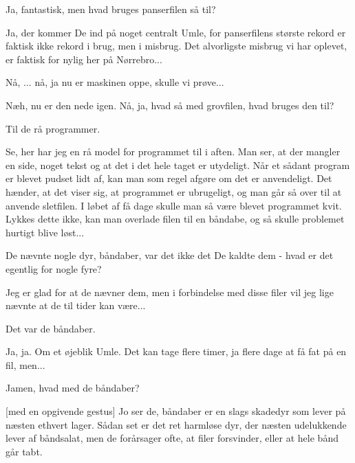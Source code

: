\documentclass[a4paper,11pt]{article}
\begin{document}
\begin{sketch}
   Ja, fantastisk, men hvad bruges panserfilen så til?

   Ja, der kommer De ind på noget centralt Umle, for
  panserfilens største rekord er faktisk ikke rekord i brug, men i
  misbrug.  Det alvorligste misbrug vi har oplevet, er faktisk for
  nylig her på Nørrebro...


   Nå, ... nå, ja nu er maskinen oppe, skulle vi prøve...


   Næh, nu er den nede igen.  Nå, ja, hvad så med grovfilen,
  hvad bruges den til?

   Til de rå programmer.


   Se, her har jeg en rå model for programmet til i aften.
  Man ser, at der mangler en side, noget tekst og at det i det hele
  taget er utydeligt.  Når et sådant program er blevet pudset lidt af,
  kan man som regel afgøre om det er anvendeligt.  Det hænder, at det
  viser sig, at programmet er ubrugeligt, og man går så over til at
  anvende sletfilen.  I løbet af få dage skulle man så være blevet
  programmet kvit.  Lykkes dette ikke, kan man overlade filen til en
  båndabe, og så skulle problemet hurtigt blive løst...

   De nævnte nogle dyr, båndaber, var det ikke det De kaldte
  dem - hvad er det egentlig for nogle fyre?

   Jeg er glad for at de nævner dem, men i forbindelse med
  disse filer vil jeg lige nævnte at de til tider kan være...

   Det var de båndaber.

   Ja, ja.  Om et øjeblik Umle.  Det kan tage flere timer, ja
  flere dage at få fat på en fil, men...

   Jamen, hvad med de båndaber?

  [med en opgivende gestus] Jo ser de, båndaber er en slags
  skadedyr som lever på næsten ethvert lager.  Sådan set er det ret
  harmløse dyr, der næsten udelukkende lever af båndsalat, men de
  forårsager ofte, at filer forsvinder, eller at hele bånd går tabt.


\end{sketch}
\end{document}
